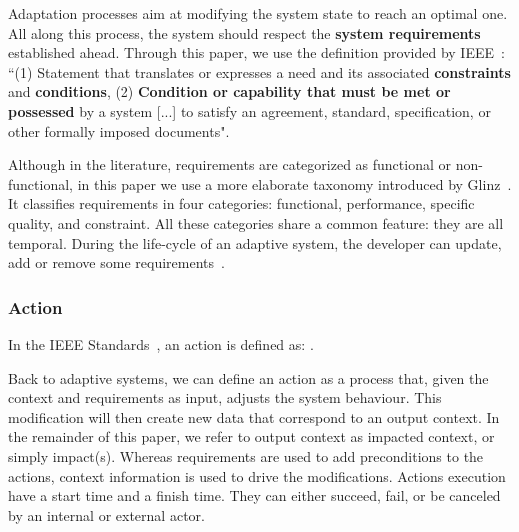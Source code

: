 Adaptation processes aim at modifying the system state to reach an optimal one.
All along this process, the system should respect the \textbf{system requirements} established ahead. 
Through this paper, we use the definition provided by IEEE~\cite{iso2017systems}: ``(1) Statement that translates or expresses a need and its associated \textbf{constraints} and \textbf{conditions}, (2) \textbf{Condition or capability that must be met or possessed} by a system [...] to satisfy an agreement, standard, specification, or other formally imposed documents".

Although in the literature, requirements are categorized as functional or non-func\-tional, in this paper we use a more elaborate taxonomy introduced by Glinz~\cite{DBLP:conf/re/Glinz07}.
It classifies requirements in four categories: functional, performance, specific quality, and constraint.
All these categories share a common feature: they are all temporal.
During the life-cycle of an adaptive system, the developer can update, add or remove some requirements~\cite{DBLP:conf/icse/ChengA07, pandey2010effective}.

\subsubsection{Action}
In the IEEE Standards~\cite{iso2017systems}, an action is defined as: .

Back to adaptive systems, we can define an action as a process that, given the context and requirements as input, adjusts the system behaviour.
This modification will then create new data that correspond to an output context. In the remainder of this paper, we refer to output context as impacted context, or simply impact(s).
Whereas requirements are used to add preconditions to the actions, context information is used to drive the modifications.
Actions execution have a start time and a finish time. They can either succeed, fail, or be canceled by an internal or external actor.

